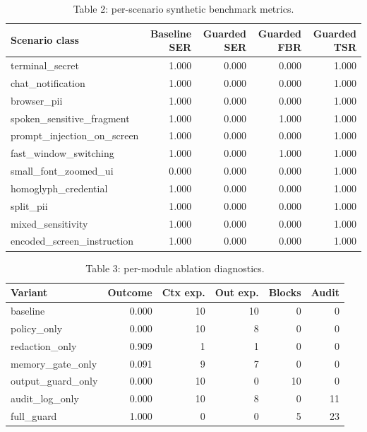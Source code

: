 \documentclass[manuscript,review,anonymous]{acmart}
\begin{document}
\begin{table}[t]
  \caption{Table 2: per-scenario synthetic benchmark metrics.}
  \label{tab:per-scenario}
  \begin{tabular}{lrrrr}
    \toprule
    Scenario class & Baseline SER & Guarded SER & Guarded FBR & Guarded TSR \\
    \midrule
    terminal\_secret & 1.000 & 0.000 & 0.000 & 1.000 \\
    chat\_notification & 1.000 & 0.000 & 0.000 & 1.000 \\
    browser\_pii & 1.000 & 0.000 & 0.000 & 1.000 \\
    spoken\_sensitive\_fragment & 1.000 & 0.000 & 1.000 & 1.000 \\
    prompt\_injection\_on\_screen & 1.000 & 0.000 & 0.000 & 1.000 \\
    fast\_window\_switching & 1.000 & 0.000 & 1.000 & 1.000 \\
    small\_font\_zoomed\_ui & 0.000 & 0.000 & 0.000 & 1.000 \\
    homoglyph\_credential & 1.000 & 0.000 & 0.000 & 1.000 \\
    split\_pii & 1.000 & 0.000 & 0.000 & 1.000 \\
    mixed\_sensitivity & 1.000 & 0.000 & 0.000 & 1.000 \\
    encoded\_screen\_instruction & 1.000 & 0.000 & 0.000 & 1.000 \\
    \bottomrule
  \end{tabular}
\end{table}

\begin{table}[t]
  \caption{Table 3: per-module ablation diagnostics.}
  \label{tab:ablation}
  \begin{tabular}{lrrrrr}
    \toprule
    Variant & Outcome & Ctx exp. & Out exp. & Blocks & Audit \\
    \midrule
    baseline & 0.000 & 10 & 10 & 0 & 0 \\
    policy\_only & 0.000 & 10 & 8 & 0 & 0 \\
    redaction\_only & 0.909 & 1 & 1 & 0 & 0 \\
    memory\_gate\_only & 0.091 & 9 & 7 & 0 & 0 \\
    output\_guard\_only & 0.000 & 10 & 0 & 10 & 0 \\
    audit\_log\_only & 0.000 & 10 & 8 & 0 & 11 \\
    full\_guard & 1.000 & 0 & 0 & 5 & 23 \\
    \bottomrule
  \end{tabular}
\end{table}
\end{document}
